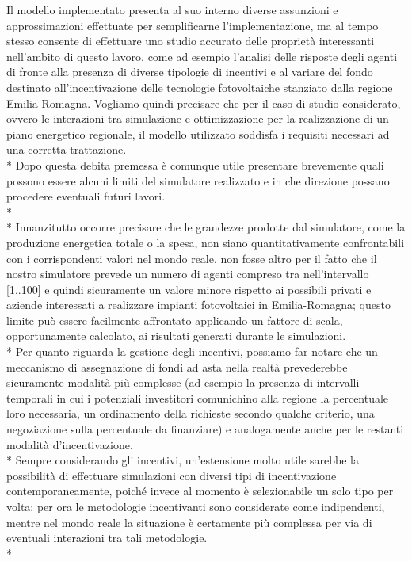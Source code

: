 \documentclass[12pt,a4paper,openright,twoside]{report}
\begin{document}
Il modello implementato presenta al suo interno diverse assunzioni e approssimazioni effettuate per semplificarne l'implementazione, ma al tempo stesso consente di effettuare uno studio accurato delle proprietà interessanti nell'ambito di questo lavoro, come ad esempio l'analisi delle risposte degli agenti di fronte alla presenza di diverse tipologie di incentivi e al variare del fondo destinato all'incentivazione delle tecnologie fotovoltaiche stanziato dalla regione Emilia-Romagna. Vogliamo quindi precisare che per il caso di studio considerato, ovvero le interazioni tra simulazione e ottimizzazione per la realizzazione di un piano energetico regionale, il modello utilizzato soddisfa i requisiti necessari ad una corretta trattazione.\\*
Dopo questa debita premessa è comunque utile presentare brevemente quali possono essere alcuni limiti del simulatore realizzato e in che direzione possano procedere eventuali futuri lavori.\\* \\*
Innanzitutto occorre precisare che le grandezze prodotte dal simulatore, come la produzione energetica totale o la spesa, non siano quantitativamente confrontabili con i corrispondenti valori nel mondo reale, non fosse altro per il fatto che il nostro simulatore prevede un numero di agenti compreso tra nell'intervallo [1..100] e quindi sicuramente un valore minore rispetto ai possibili privati e aziende interessati a realizzare impianti fotovoltaici in Emilia-Romagna; questo limite può essere facilmente affrontato applicando un fattore di scala, opportunamente calcolato, ai risultati generati durante le simulazioni.\\*
Per quanto riguarda la gestione degli incentivi, possiamo far notare che un meccanismo di assegnazione di fondi ad asta nella realtà prevederebbe sicuramente modalità più complesse (ad esempio la presenza di intervalli temporali in cui i potenziali investitori comunichino alla regione la percentuale loro necessaria, un ordinamento della richieste secondo qualche criterio, una negoziazione sulla percentuale da finanziare) e analogamente anche per le restanti modalità d'incentivazione.\\*
Sempre considerando gli incentivi, un'estensione molto utile sarebbe la possibilità di effettuare simulazioni con diversi tipi di incentivazione contemporaneamente, poiché invece al momento è selezionabile un solo tipo per volta; per ora le metodologie incentivanti sono considerate come indipendenti, mentre nel mondo reale la situazione è certamente più complessa per via di eventuali interazioni tra tali metodologie.\\*
\end{document}
